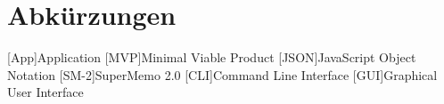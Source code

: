 \chapter{Abkürzungen}\label{a:Abkuerzungen}

\begin{acronym}
    [App]{Application}
    [MVP]{Minimal Viable Product}
    [JSON]{JavaScript Object Notation}
    [SM-2]{SuperMemo 2.0}
    [CLI]{Command Line Interface}
    [GUI]{Graphical User Interface}
\end{acronym}